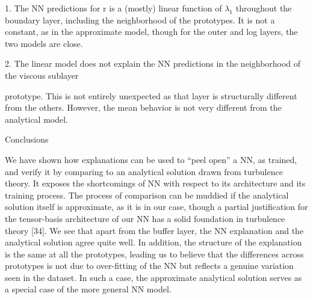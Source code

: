 1. The NN predictions for r is a (mostly) linear function of $\lambda_1$ throughout the boundary layer, including the neighborhood of the prototypes. It is not a constant, as in the approximate model, though for the outer and log layers, the two models are close.

2. The linear model does not explain the NN predictions in the neighborhood of the viscous sublayer

prototype. This is not entirely unexpected as that layer is structurally different from the others.
However, the mean behavior is not very different from the analytical model.

Conclusions

We have shown how explanations can be used to “peel open” a NN, as trained, and verify it by comparing
to an analytical solution drawn from turbulence theory. It exposes the shortcomings of NN with respect to
its architecture and its training process. The process of comparison can be muddied if the analytical
solution itself is approximate, as it is in our case, though a partial justiﬁcation for the tensor-basis
architecture of our NN has a solid foundation in turbulence theory [34]. We see that apart from the buffer
layer, the NN explanation and the analytical solution agree quite well. In addition, the structure of the
explanation is the same at all the prototypes, leading us to believe that the differences across prototypes is
not due to over-ﬁtting of the NN but reﬂects a genuine variation seen in the dataset. In such a case, the
approximate analytical solution serves as a special case of the more general NN model.



